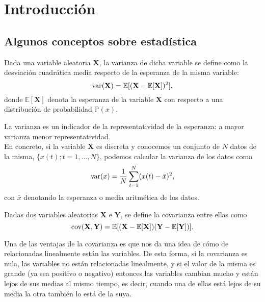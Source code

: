 %
%


\chapter{Introducción}
\setcounter{page}{1}

\section{Algunos conceptos sobre estadística}

\begin{definicion}[Varianza]
	Dada una variable aleatoria $\mathbf{X}$, la varianza de dicha variable se define como la desviación cuadrática media respecto de la esperanza de la misma variable:
	\[	\text{var}{(\mathbf{X})} = \mathbb{E}[(\mathbf{X} - \mathbb{E}[\mathbf{X}])^2],	\]
	donde $\mathbb{E}[\mathbf{X}]$ denota la esperanza de la variable $\mathbf{X}$ con respecto a una distribución de probabilidad $\mathbb{P}(x)$.
\end{definicion}

La varianza es un indicador de la representatividad de la esperanza: a mayor varianza menor representatividad.\\

En concreto, si la variable $\mathbf{X}$ es discreta y conocemos un conjunto de $N$ datos de la misma, $\{x(t); t=1,\dots,N\}$, podemos calcular la varianza de los datos como 
\[	\text{var}{(x)} = \frac{1}{N} \sum_{t=1}^N(x(t)-\bar{x})^2,	\]
con $\bar{x}$ denotando la esperanza o media aritmética de los datos.

\begin{definicion}[Covarianza]
	Dadas dos variables aleatorias $\mathbf{X}$ e $\mathbf{Y}$, se define la covarianza entre ellas como
	\[	\text{cov}{(\mathbf{X}, \mathbf{Y})} = \mathbb{E}[(\mathbf{X}-\mathbb{E}[\mathbf{X}])(\mathbf{Y}-\mathbb{E}[\mathbf{Y}])].	\]
\end{definicion}

Una de las ventajas de la covarianza es que nos da una idea de cómo de relacionadas linealmente están las variables. De esta forma, si la covarianza es nula, las variables no están relacionadas linealmente, y si el valor de la misma es grande (ya sea positivo o negativo) entonces las variables cambian mucho y están lejos de sus medias al mismo tiempo, es decir, cuando una de ellas está lejos de su media la otra también lo está de la suya.

